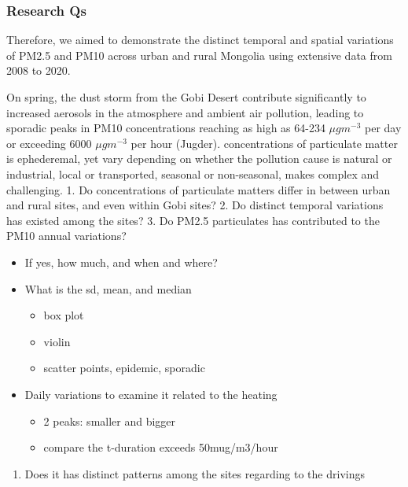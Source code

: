 \documentclass[
  11pt,
]{article}
\providecommand{\tightlist}{%
  \setlength{\itemsep}{0pt}\setlength{\parskip}{0pt}}
\begin{document}
\subsubsection{Research Qs}\label{research-qs}

Therefore, we aimed to demonstrate the distinct temporal and spatial
variations of PM2.5 and PM10 across urban and rural Mongolia using
extensive data from 2008 to 2020.

On spring, the dust storm from the Gobi Desert contribute significantly
to increased aerosols in the atmosphere and ambient air pollution,
leading to sporadic peaks in PM10 concentrations reaching as high as
64-234 \(\mu g m^{-3}\) per day or exceeding 6000 \(\mu g m^{-3}\) per
hour (Jugder). concentrations of particulate matter is ephederemal, yet
vary depending on whether the pollution cause is natural or industrial,
local or transported, seasonal or non-seasonal, makes complex and
challenging. 1. Do concentrations of particulate matters differ in
between urban and rural sites, and even within Gobi sites? 2. Do
distinct temporal variations has existed among the sites? 3. Do PM2.5
particulates has contributed to the PM10 annual variations?

\begin{itemize}
\tightlist
\item
  If yes, how much, and when and where?
\item
  What is the sd, mean, and median

  \begin{itemize}
  \tightlist
  \item
    box plot
  \item
    violin
  \item
    scatter points, epidemic, sporadic
  \end{itemize}
\item
  Daily variations to examine it related to the heating

  \begin{itemize}
  \tightlist
  \item
    2 peaks: smaller and bigger
  \item
    compare the t-duration exceeds 50mug/m3/hour
  \end{itemize}
\end{itemize}

\begin{enumerate}
\def\labelenumi{\arabic{enumi}.}
\setcounter{enumi}{3}
\tightlist
\item
  Does it has distinct patterns among the sites regarding to the
  drivings
\end{enumerate}
\end{document}
